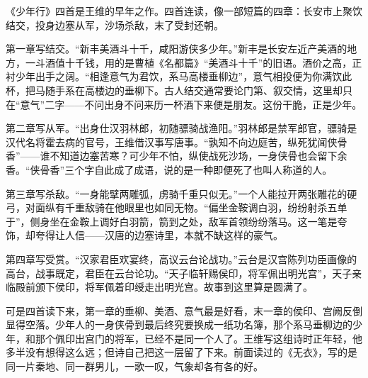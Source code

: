 \begin{appreciation}
《少年行》四首是王维的早年之作。四首连读，像一部短篇的四章：长安市上聚饮结交，投身边塞从军，沙场杀敌，末了受封还朝。

第一章写结交。“新丰美酒斗十千，咸阳游侠多少年。”新丰是长安左近产美酒的地方，一斗酒值十千钱，用的是曹植《名都篇》“美酒斗十千”的旧语。酒价之高，正衬少年出手之阔。“相逢意气为君饮，系马高楼垂柳边”，意气相投便为你满饮此杯，把马随手系在高楼边的垂柳下。古人结交通常要论门第、叙交情，这里却只在“意气”二字——不问出身不问来历一杯酒下来便是朋友。这份干脆，正是少年。

第二章写从军。“出身仕汉羽林郎，初随骠骑战渔阳。”羽林郎是禁军郎官，骠骑是汉代名将霍去病的官号，王维借汉事写唐事。“孰知不向边庭苦，纵死犹闻侠骨香”——谁不知道边塞苦寒？可少年不怕，纵使战死沙场，一身侠骨也会留下余香。“侠骨香”三个字自此成了成语，说的是一种即便死了也叫人称道的人。

第三章写杀敌。“一身能擘两雕弧，虏骑千重只似无。”一个人能拉开两张雕花的硬弓，对面纵有千重敌骑在他眼里也如同无物。“偏坐金鞍调白羽，纷纷射杀五单于”，侧身坐在金鞍上调好白羽箭，箭到之处，敌军首领纷纷落马。这一笔是夸饰，却夸得让人信——汉唐的边塞诗里，本就不缺这样的豪气。

第四章写受赏。“汉家君臣欢宴终，高议云台论战功。”云台是汉宫陈列功臣画像的高台，战事既定，君臣在云台论功。“天子临轩赐侯印，将军佩出明光宫”，天子亲临殿前颁下侯印，将军佩着印绶走出明光宫。故事到这里算是圆满了。

可是四首读下来，第一章的垂柳、美酒、意气最是好看，末一章的侯印、宫阙反倒显得空落。少年人的一身侠骨到最后终究要换成一纸功名簿，那个系马垂柳边的少年，和那个佩印出宫门的将军，已经不是同一个人了。王维写这组诗时正年轻，他多半没有想得这么远；但诗自己把这一层留了下来。前面读过的《无衣》，写的是同一片秦地、同一群男儿，一歌一叹，气象却各有各的好。
\end{appreciation}
